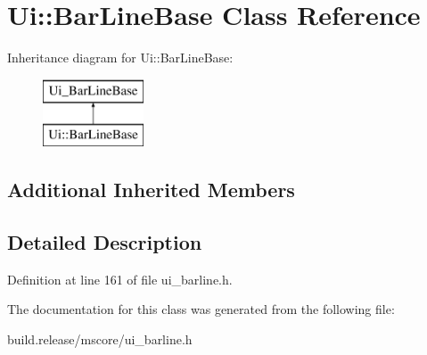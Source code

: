\hypertarget{class_ui_1_1_bar_line_base}{}\section{Ui\+:\+:Bar\+Line\+Base Class Reference}
\label{class_ui_1_1_bar_line_base}
Inheritance diagram for Ui\+:\+:Bar\+Line\+Base\+:\begin{figure}[H]
\begin{center}
\leavevmode
\includegraphics[height=2.000000cm]{class_ui_1_1_bar_line_base}
\end{center}
\end{figure}
\subsection*{Additional Inherited Members}


\subsection{Detailed Description}


Definition at line 161 of file ui\+\_\+barline.\+h.



The documentation for this class was generated from the following file\+:\begin{DoxyCompactItemize}
\item 
build.\+release/mscore/ui\+\_\+barline.\+h\end{DoxyCompactItemize}
